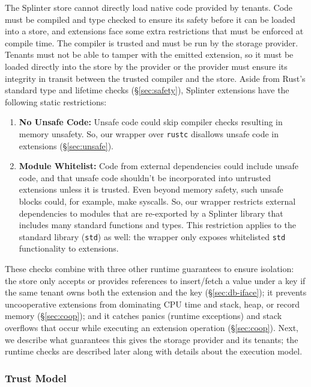 The Splinter store cannot directly load native code provided by tenants.
Code must be compiled and type checked to ensure its safety before it can be
  loaded into a store, and extensions face some extra restrictions that must be
  enforced at compile time.
The compiler is trusted and must be run by the storage provider.
Tenants must not be able to tamper with the emitted extension, so it must be
  loaded directly into the store by the provider or the provider must
  ensure its integrity in transit between the trusted compiler and the store.
Aside from Rust's standard type and lifetime checks (\S\ref{sec:safety}),
  Splinter extensions have the following static restrictions:
  \begin{enumerate}
    \item {\bf No Unsafe Code:}
      Unsafe code could skip compiler checks resulting in memory unsafety.
      So, our wrapper over \texttt{rustc} disallows unsafe code in extensions
      (\S\ref{sec:unsafe}).
    \item {\bf Module Whitelist:}
      Code from external dependencies could include unsafe code, and that
        unsafe code shouldn't be incorporated into untrusted extensions unless it
        is trusted.
      Even beyond memory safety, such unsafe blocks could, for example, make
        syscalls.
      So, our wrapper restricts external dependencies to modules that are
        re-exported by a Splinter library that includes many standard functions
        and types.
      This restriction applies to the standard library (\texttt{std}) as well: the
        wrapper only exposes whitelisted \texttt{std} functionality to extensions.
  \end{enumerate}
These checks combine with three other runtime guarantees to
  ensure isolation:
the store only accepts or provides references to insert/fetch a value under a key
  if the same tenant owns both the extension and the key (\S\ref{sec:db-iface});
it prevents uncooperative extensions from dominating CPU time and stack, heap, or record memory (\S\ref{sec:coop}); and
it catches panics (runtime exceptions) and stack overflows that occur while executing an
  extension operation (\S\ref{sec:coop}).
Next, we describe what guarantees this gives the storage provider and its tenants;
  the runtime checks are described later along with details about the execution model.

\subsubsection{Trust Model}
\label{sec:trust}

